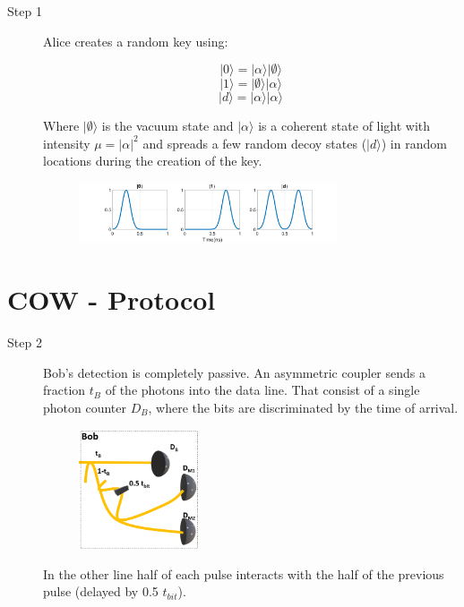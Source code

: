 \documentclass[1000pt]{article}
\newcommand{\mysection}[1]{\section*{\color{black}\sffamily #1}}%
\begin{document}
\begin{description}
  \item[Step 1] Alice creates a random key using:  

$$|0\rangle = |\alpha\rangle |\emptyset\rangle$$      
  $$|1\rangle = |\emptyset\rangle |\alpha\rangle$$
$$|d\rangle = |\alpha\rangle |\alpha\rangle$$

Where $|\emptyset\rangle$ is the vacuum state and $|\alpha\rangle$ is a coherent state of light with intensity $\mu=|\alpha|^2$ and spreads a few random decoy states ($|d\rangle$) in random locations during the creation of the key.
      
  \begin{figure}[hbt]
    	\centering
    	\includegraphics[width=0.75\textwidth]{./figures/Simple.png}
        	\label{Simple}
    \end{figure}

\end{description}



\mysection{\Huge COW - Protocol}\Large

\begin{description}
  \item[Step 2] Bob's detection is completely passive. An asymmetric coupler sends a fraction $t_B$ of the photons into the data line. That consist of a single photon counter $D_B$, where the bits are discriminated by the time of arrival.

    
    \begin{figure}[hbt]
    	\centering
    	\includegraphics[width=0.35\textwidth]{./figures/Bob.png}
        	\label{bob}
    \end{figure}
In the other line half of each pulse interacts with the half of the previous pulse (delayed by 0.5 $t_{bit}$).
\end{description}  
\end{document}
